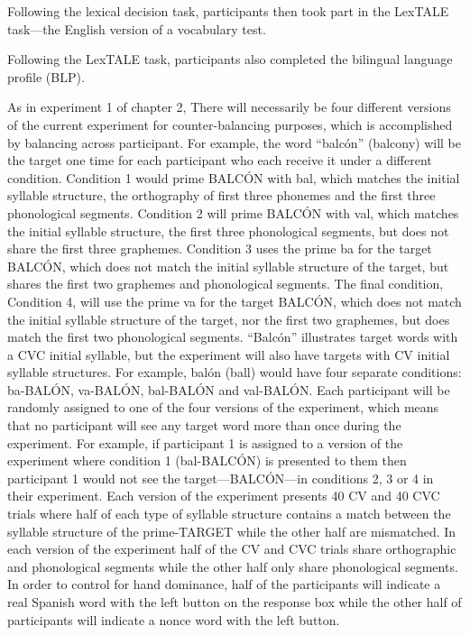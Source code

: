 Following the lexical decision task, participants then took part in the LexTALE task---the English version of a vocabulary test.

Following the LexTALE task, participants also completed the bilingual language profile (BLP).

As in experiment 1 of chapter 2, There will necessarily be four different versions of the current experiment for counter-balancing purposes, which is accomplished by balancing across participant. For example, the word “balcón” (balcony) will be the target one time for each participant who each receive it under a different condition. Condition 1 would prime BALCÓN with bal, which matches the initial syllable structure, the orthography of first three phonemes and the first three phonological segments. Condition 2 will prime BALCÓN with val, which matches the initial syllable structure, the first three phonological segments, but does not share the first three graphemes. Condition 3 uses the prime ba for the target BALCÓN, which does not match the initial syllable structure of the target, but shares the first two graphemes and phonological segments. The final condition, Condition 4, will use the prime va for the target BALCÓN, which does not match the initial syllable structure of the target, nor the first two graphemes, but does match the first two phonological segments. “Balcón” illustrates target words with a CVC initial syllable, but the experiment will also have targets with CV initial syllable structures. For example, balón (ball) would have four separate conditions: ba-BALÓN, va-BALÓN, bal-BALÓN and val-BALÓN.
Each participant will be randomly assigned to one of the four versions of the experiment, which means that no participant will see any target word more than once during the experiment. For example, if participant 1 is assigned to a version of the experiment where condition 1 (bal-BALCÓN) is presented to them then participant 1 would not see the target—BALCÓN—in conditions 2, 3 or 4 in their experiment. Each version of the experiment presents 40 CV and 40 CVC trials where half of each type of syllable structure contains a match between the syllable structure of the prime-TARGET while the other half are mismatched. In each version of the experiment half of the CV and CVC trials share orthographic and phonological segments while the other half only share phonological segments. In order to control for hand dominance, half of the participants will indicate a real Spanish word with the left button on the response box while the other half of participants will indicate a nonce word with the left button.

